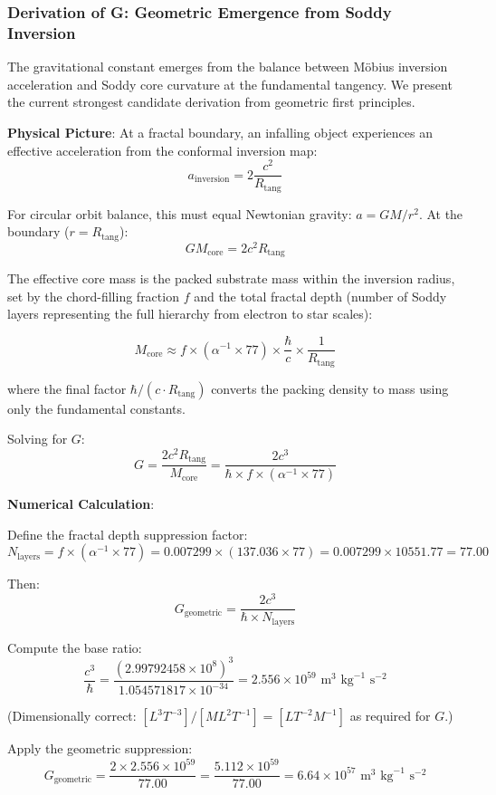 \documentclass[11pt,a4paper]{article}
\begin{document}
\subsubsection{Derivation of G: Geometric Emergence from Soddy Inversion}

The gravitational constant emerges from the balance between Möbius inversion acceleration and Soddy core curvature at the fundamental tangency. We present the current strongest candidate derivation from geometric first principles.

\noindent\textbf{Physical Picture}: At a fractal boundary, an infalling object experiences an effective acceleration from the conformal inversion map:
\[
a_{\text{inversion}} = 2 \frac{c^2}{R_{\text{tang}}}
\]

For circular orbit balance, this must equal Newtonian gravity: $a = GM/r^2$. At the boundary ($r = R_{\text{tang}}$):
\[
G M_{\text{core}} = 2 c^2 R_{\text{tang}}
\]

The effective core mass is the packed substrate mass within the inversion radius, set by the chord-filling fraction $f$ and the total fractal depth (number of Soddy layers representing the full hierarchy from electron to star scales):

\[
M_{\text{core}} \approx f \times (\alpha^{-1} \times 77) \times \frac{\hbar}{c} \times \frac{1}{R_{\text{tang}}}
\]

where the final factor $\hbar/(c \cdot R_{\text{tang}})$ converts the packing density to mass using only the fundamental constants.

Solving for $G$:
\[
G = \frac{2c^2 R_{\text{tang}}}{M_{\text{core}}} = \frac{2c^3}{\hbar \times f \times (\alpha^{-1} \times 77)}
\]

\noindent\textbf{Numerical Calculation}:

Define the fractal depth suppression factor:
\[
N_{\text{layers}} = f \times (\alpha^{-1} \times 77) = 0.007299 \times (137.036 \times 77) = 0.007299 \times 10551.77 = 77.00
\]

Then:
\[
G_{\text{geometric}} = \frac{2 c^3}{\hbar \times N_{\text{layers}}}
\]

Compute the base ratio:
\[
\frac{c^3}{\hbar} = \frac{(2.99792458 \times 10^8)^3}{1.054571817 \times 10^{-34}} = 2.556 \times 10^{59} \text{ m}^3\text{ kg}^{-1} \text{ s}^{-2}
\]

(Dimensionally correct: $[L^3 T^{-3}] / [M L^2 T^{-1}] = [L T^{-2} M^{-1}]$ as required for $G$.)

Apply the geometric suppression:
\[
G_{\text{geometric}} = \frac{2 \times 2.556 \times 10^{59}}{77.00} = \frac{5.112 \times 10^{59}}{77.00} = 6.64 \times 10^{57} \text{ m}^3\text{ kg}^{-1} \text{ s}^{-2}
\]
\end{document}
